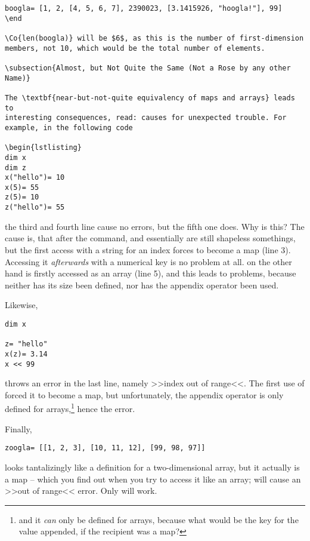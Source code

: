 \begin{lstlisting}
boogla= [1, 2, [4, 5, 6, 7], 2390023, [3.1415926, "hoogla!"], 99]
\end

\Co{len(boogla)} will be $6$, as this is the number of first-dimension
members, not 10, which would be the total number of elements.

\subsection{Almost, but Not Quite the Same (Not a Rose by any other
Name)}

The \textbf{near-but-not-quite equivalency of maps and arrays} leads to
interesting consequences, read: causes for unexpected trouble. For
example, in the following code

\begin{lstlisting}
dim x
dim z
x("hello")= 10
x(5)= 55
z(5)= 10
z("hello")= 55
\end{lstlisting}

the third and fourth line cause no errors, but the fifth one does. Why
is this? The cause is, that after the  command,  and
 essentially are still shapeless somethings, but the first access
with a string for an index forces  to become a map (line 3).
Accessing it \emph{afterwards} with a numerical key is no problem at
all.  on the other hand is firstly accessed as an array (line 5),
and this leads to problems, because neither has its size been defined,
nor has the appendix operator been used.

Likewise,

\begin{lstlisting}
dim x

z= "hello"
x(z)= 3.14
x << 99
\end{lstlisting}

throws an error in the last line, namely >>index out of range<<. The
first use of  forced it to become a map, but unfortunately, the
appendix operator is only defined for arrays,\footnote{and it \emph{can}
only be defined for arrays, because what would be the key for the value
appended, if the recipient was a map?} hence the error.

Finally,

\begin{lstlisting}
zoogla= [[1, 2, 3], [10, 11, 12], [99, 98, 97]]
\end{lstlisting}

looks tantalizingly like a definition for a two-dimensional array, but
it actually is a map -- which you find out when you try to access it
like an array;  will cause an >>out of range<< error.
Only  will work.

